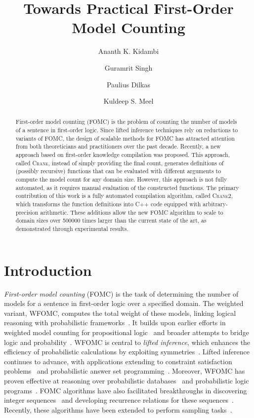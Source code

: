 \documentclass[a4paper,UKenglish,cleveref,autoref,table]{lipics-v2021}
\title{Towards Practical First-Order Model Counting}
\author{Ananth K. Kidambi}{Indian Institute of Technology Bombay, Mumbai, India}{210051002@iitb.ac.in}{}{}
\author{Guramrit Singh}{Indian Institute of Technology Bombay, Mumbai, India}{guramrit@iitb.ac.in}{}{}
\author{Paulius Dilkas}{University of Toronto, Toronto, Canada \and Vector Institute, Toronto, Canada \and \url{https://dilkas.github.io/}}{paulius.dilkas@utoronto.ca}{https://orcid.org/0000-0001-9185-7840}{}
\author{Kuldeep S. Meel}{Georgia Institute of Technology, Atlanta, GA, USA \and University of Toronto, Toronto, Canada \and \url{https://www.cs.toronto.edu/~meel/}}{meel@cs.toronto.edu}{https://orcid.org/0000-0001-9423-5270}{}
\newcommand{\Cranetwo}{\textsc{Crane2}}
\begin{document}
\maketitle

\begin{abstract}
  First-order model counting (FOMC) is the problem of counting the number of
  models of a sentence in first-order logic. Since lifted inference techniques
  rely on reductions to variants of FOMC, the design of scalable methods for
  FOMC has attracted attention from both theoreticians and practitioners over
  the past decade. Recently, a new approach based on first-order knowledge
  compilation was proposed. This approach, called \textsc{Crane}, instead of
  simply providing the final count, generates definitions of (possibly
  recursive) functions that can be evaluated with different arguments to compute
  the model count for any domain size. However, this approach is not fully
  automated, as it requires manual evaluation of the constructed functions. The
  primary contribution of this work is a fully automated compilation algorithm,
  called \Cranetwo{}, which transforms the function definitions into C++ code
  equipped with arbitrary-precision arithmetic. These additions allow the new
  FOMC algorithm to scale to domain sizes over \num{500000} times larger than
  the current state of the art, as demonstrated through experimental results.
\end{abstract}

\section{Introduction}

\emph{First-order model counting} (FOMC) is the task of determining the number
of models for a sentence in first-order logic over a specified domain. The
weighted variant, WFOMC, computes the total weight of these models, linking
logical reasoning with probabilistic
frameworks~\cite{DBLP:conf/ijcai/BroeckTMDR11}. It builds upon earlier efforts
in weighted model counting for propositional
logic~\cite{DBLP:journals/ai/ChaviraD08} and broader attempts to bridge logic
and
probability~\cite{DBLP:journals/ai/Nilsson86,novak2012mathematical,vsaletic2024graded}.
WFOMC is central to \emph{lifted inference}, which enhances the efficiency of
probabilistic calculations by exploiting
symmetries~\cite{DBLP:conf/ecai/Kersting12}. Lifted inference continues to
advance, with applications extending to constraint satisfaction
problems~\cite{DBLP:journals/jair/TotisDRK23} and probabilistic answer set
programming~\cite{DBLP:journals/ijar/AzzoliniR23}. Moreover, WFOMC has proven
effective at reasoning over probabilistic
databases~\cite{DBLP:journals/debu/GribkoffSB14} and probabilistic logic
programs~\cite{DBLP:journals/ijar/RiguzziBZCL17}. FOMC algorithms have also
facilitated breakthroughs in discovering integer
sequences~\cite{DBLP:conf/ijcai/SvatosJT0K23} and developing recurrence
relations for these sequences~\cite{DBLP:conf/kr/DilkasB23}. Recently, these
algorithms have been extended to perform sampling
tasks~\cite{DBLP:journals/ai/WangPWK24}.
\end{document}
